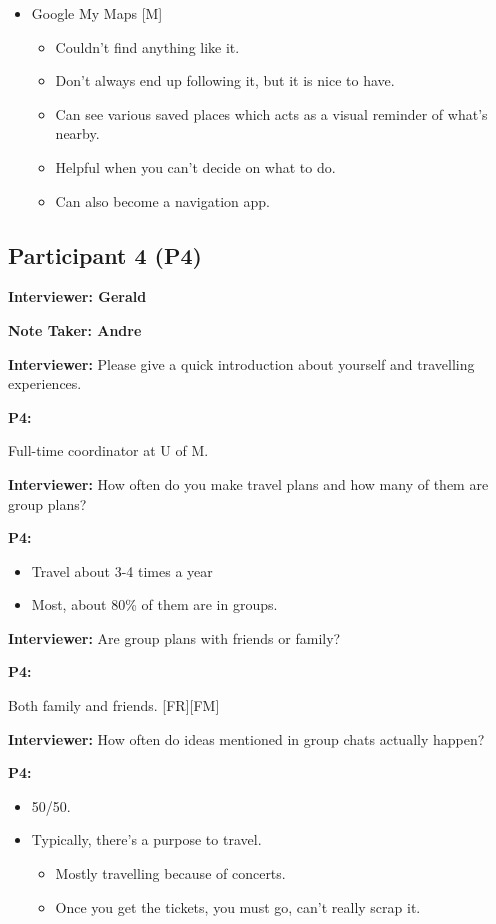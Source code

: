 \documentclass[12pt,a4paper]{article}
\begin{document}
\begin{itemize}
    \item Google My Maps [M]
    \begin{itemize}
        \item Couldn’t find anything like it.
        \item Don’t always end up following it, but it is nice to have. 
        \item Can see various saved places which acts as a visual reminder of what’s nearby. 
        \item Helpful when you can’t decide on what to do. 
        \item Can also become a navigation app.  
    \end{itemize}
\end{itemize}

\subsection{Participant 4 (P4)}

\textbf{Interviewer: Gerald}

\textbf{Note Taker: Andre}

\textbf{Interviewer: }Please give a quick introduction about yourself and travelling experiences.

\textbf{P4: }

Full-time coordinator at U of M. 

\textbf{Interviewer: }How often do you make travel plans and how many of them are group plans? 

\textbf{P4:}

\begin{itemize}
    \item Travel about 3-4 times a year
    \item Most, about 80\% of them are in groups. 
\end{itemize}

\textbf{Interviewer: }Are group plans with friends or family? 

\textbf{P4:}

Both family and friends. [FR][FM]

\textbf{Interviewer: }How often do ideas mentioned in group chats actually happen? 

\textbf{P4:}

\begin{itemize}
    \item 50/50.
    \item Typically, there’s a purpose to travel. 
    \begin{itemize}
        \item Mostly travelling because of concerts. 
        \item Once you get the tickets, you must go, can’t really scrap it. 
    \end{itemize}
\end{itemize}
\end{document}
